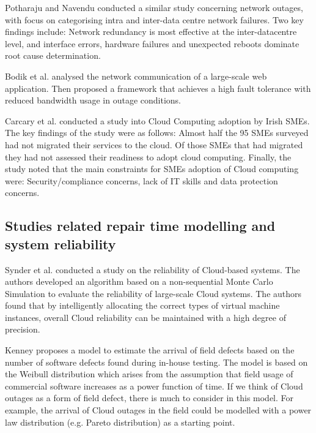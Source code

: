 Potharaju and Navendu \cite{potharaju2013network} conducted a similar study concerning network outages, with focus on categorising intra and inter-data centre network failures. Two key findings include: Network redundancy is most effective at the inter-datacentre level, and interface errors, hardware failures and unexpected reboots dominate root cause determination. \par

Bodik et al. \cite{bodik2012surviving} analysed the network communication of a large-scale web application. Then proposed a framework that achieves a high fault tolerance with reduced bandwidth usage in outage conditions. \par 

Carcary et al. \cite{carcary2014adoption} conducted a study into Cloud Computing adoption by Irish SMEs. The key findings of the study were as follows: Almost half the 95 SMEs surveyed had not migrated their services to the cloud. Of those SMEs that had migrated they had not assessed their readiness to adopt cloud computing. Finally, the study noted that the main constraints for SMEs adoption of Cloud computing were: Security/compliance concerns, lack of IT skills and data protection concerns. \par

\subsection{Studies related repair time modelling and system reliability}

Synder et al. \cite{snyder2015evaluation} conducted a study on the reliability of Cloud-based systems. The authors developed an algorithm based on a non-sequential Monte Carlo Simulation to evaluate the reliability of large-scale Cloud systems. The authors found that by intelligently allocating the correct types of virtual machine instances, overall Cloud reliability can be maintained with a high degree of precision. \par

Kenney \cite{kenny1993estimating} proposes a model to estimate the arrival of field defects based on the number of software defects found during in-house testing. The model is based on the Weibull distribution which arises from the assumption that field usage of commercial software increases as a power function of time. If we think of Cloud outages as a form of field defect, there is much to consider in this model. For example, the arrival of Cloud outages in the field could be modelled with a power law distribution (e.g. Pareto distribution) as a starting point. \par 

